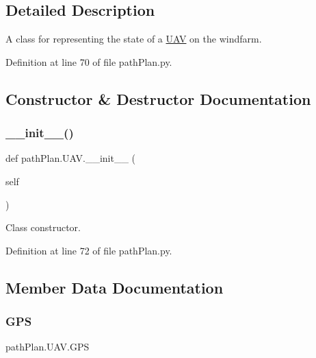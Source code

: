 \subsection{Detailed Description}
A class for representing the state of a \mbox{\hyperlink{classpath_plan_1_1_u_a_v}{U\+AV}} on the windfarm. 

Definition at line 70 of file path\+Plan.\+py.



\subsection{Constructor \& Destructor Documentation}
\mbox{\label{classpath_plan_1_1_u_a_v_a57ea529b1f8160c59ac6d3ba1b677c37}} 
\subsubsection{\texorpdfstring{\+\_\+\+\_\+init\+\_\+\+\_\+()}{\_\_init\_\_()}}
{\footnotesize\ttfamily def path\+Plan.\+U\+A\+V.\+\_\+\+\_\+init\+\_\+\+\_\+ (\begin{DoxyParamCaption}\item[{}]{self }\end{DoxyParamCaption})}



Class constructor. 



Definition at line 72 of file path\+Plan.\+py.



\subsection{Member Data Documentation}
\mbox{\label{classpath_plan_1_1_u_a_v_a759acf47734cd05447afe9e4a3f61307}} 
\subsubsection{\texorpdfstring{G\+PS}{GPS}}
{\footnotesize\ttfamily path\+Plan.\+U\+A\+V.\+G\+PS}



